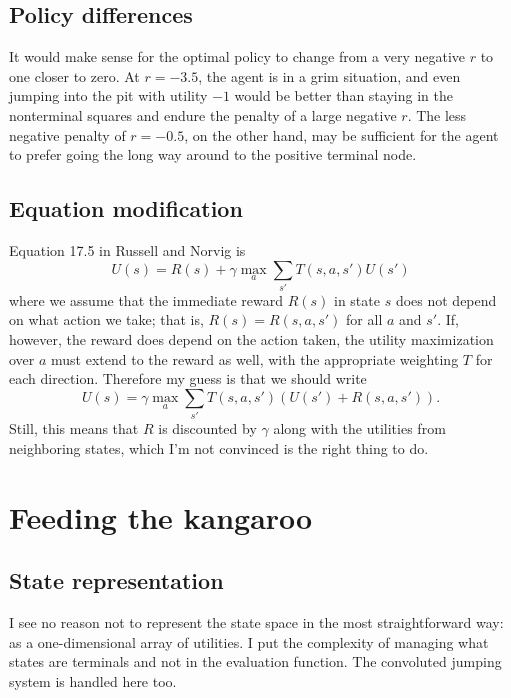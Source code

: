 \documentclass[letterpaper, 10pt]{article}
\begin{document}
\begin{multicols*}{2}
\subsection{Policy differences}
It would make sense for the optimal policy to change from a very negative $r$ to one closer to zero.
At $r = -3.5$, the agent is in a grim situation, and even jumping into the pit with utility $-1$ would be better than staying in the nonterminal squares and endure the penalty of a large negative $r$.
The less negative penalty of $r = -0.5$, on the other hand, may be sufficient for the agent to prefer going the long way around to the positive terminal node. 

\subsection{Equation modification}
Equation 17.5 in Russell and Norvig is 
\[ U(s) = R(s) + \gamma \max_a \sum_{s'} T(s, a, s') U(s') \]
where we assume that the immediate reward $R(s)$ in state $s$ does not depend on what action we take; that is, $R(s) = R(s, a, s')$ for all $a$ and $s'$. 
If, however, the reward does depend on the action taken, the utility maximization over $a$ must extend to the reward as well, with the appropriate weighting $T$ for each direction. 
Therefore my guess is that we should write 
\[  U(s) = \gamma \max_a \sum_{s'} T(s, a, s') \left( U(s') + R(s, a, s') \right). \]
Still, this means that $R$ is discounted by $\gamma$ along with the utilities from neighboring states, which I'm not convinced is the right thing to do. 


\section{Feeding the kangaroo}
\subsection{State representation}
I see no reason not to represent the state space in the most straightforward way: as a one-dimensional array of utilities. 
I put the complexity of managing what states are terminals and not in the evaluation function. 
The convoluted jumping system is handled here too. 


\end{multicols*}
\end{document}
